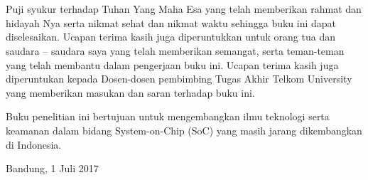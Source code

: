 \chapter*{\kataPengantar}

Puji syukur terhadap Tuhan Yang Maha Esa yang telah memberikan rahmat dan hidayah Nya serta nikmat sehat dan nikmat waktu sehingga buku ini dapat diselesaikan. Ucapan terima kasih juga diperuntukkan untuk orang tua dan saudara – saudara saya yang telah memberikan semangat, serta teman-teman yang telah membantu dalam pengerjaan buku ini. Ucapan terima kasih juga diperuntukan kepada Dosen-dosen pembimbing Tugas Akhir Telkom University yang memberikan masukan dan saran terhadap buku ini.

\vspace*{0.5cm}
\noindent Buku penelitian ini bertujuan untuk mengembangkan ilmu teknologi serta keamanan dalam bidang System-on-Chip (SoC) yang masih jarang dikembangkan di Indonesia. 

\vspace*{0.1cm}
\begin{flushright}
	Bandung, 1 Juli 2017\\[0.1cm]
	\vspace*{1cm}
	\penulis
	
\end{flushright}